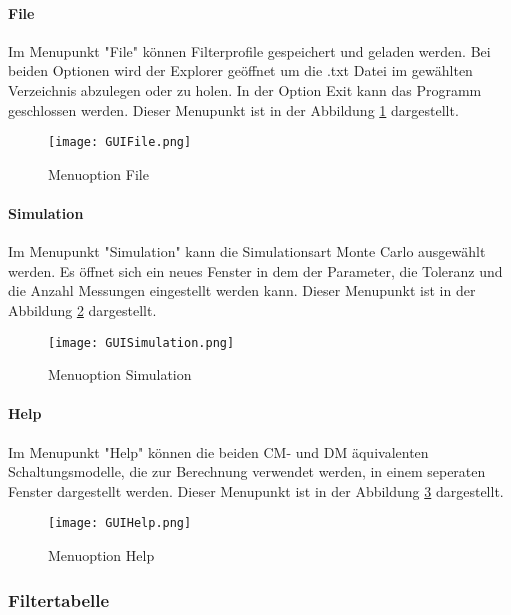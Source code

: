 \paragraph{File} \label{para:file}
Im Menupunkt "File" können Filterprofile gespeichert und geladen werden. Bei beiden Optionen wird der Explorer geöffnet um die .txt Datei im gewählten Verzeichnis abzulegen oder zu holen. In der Option Exit kann das Programm geschlossen werden. Dieser Menupunkt ist in der Abbildung \ref{fig:GUIFile}  dargestellt.

\begin{figure}[H]
	\centering
	\texttt{[image: GUIFile.png]}
	\caption{Menuoption File}
	\label{fig:GUIFile}
\end{figure}

\bigskip

\paragraph{Simulation} \label{para:simulation}
Im Menupunkt "Simulation" kann die Simulationsart Monte Carlo ausgewählt werden. Es öffnet sich ein neues Fenster in dem der Parameter, die Toleranz und die Anzahl Messungen eingestellt werden kann. Dieser Menupunkt ist in der Abbildung \ref{fig:GUISimulation} dargestellt.

\begin{figure}[H]
	\centering
	\texttt{[image: GUISimulation.png]}
	\caption{Menuoption Simulation}
	\label{fig:GUISimulation}
\end{figure}

\bigskip

\paragraph{Help} \label{para:Help}
Im Menupunkt "Help" können die beiden CM- und DM äquivalenten Schaltungsmodelle, die zur Berechnung verwendet werden, in einem seperaten Fenster dargestellt werden. Dieser Menupunkt ist in der Abbildung \ref{fig:GUIHelp}  dargestellt.

\begin{figure}[H]
	\centering
	\texttt{[image: GUIHelp.png]}
	\caption{Menuoption Help}
	\label{fig:GUIHelp}
\end{figure}
\newpage

\subsubsection{Filtertabelle} \label{subsubsec:filtertabelle}

